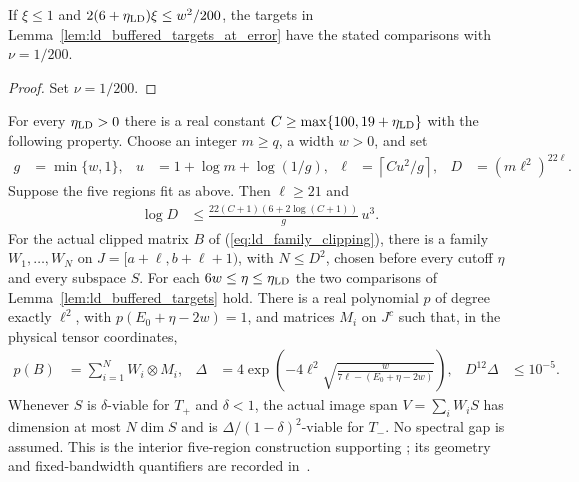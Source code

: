 \begin{lemma}
    \label{lem:ld_buffered_targets}
    \leanok
    If $\xi\le1$ and $2(6+\eta_{\rm LD})\xi\le w^2/200$, the
    targets in Lemma~\ref{lem:ld_buffered_targets_at_error} have the
    stated comparisons with $\nu=1/200$.
\end{lemma}
\begin{proof}\leanok
    Set $\nu=1/200$.
\end{proof}

\begin{theorem}
    \label{thm:fixed_bandwidth_low_energy_family}
    \leanok
    For every $\eta_{\rm LD}>0$ there is a real constant
    $C\ge\max\{100,19+\eta_{\rm LD}\}$ with the following property.
    Choose an integer $m\ge q$, a width $w>0$, and set
    \begin{align}
        g    & =\min\{w,1\},                    &
        u    & =1+\log m+\log(1/g),             &
        \ell & =\left\lceil Cu^2/g\right\rceil, &
        D    & =(m\ell^2)^{22\ell}.
        \label{eq:ld_family_parameters}
    \end{align}
    Suppose the five regions fit as above. Then $\ell\ge21$ and
    \begin{align}
        \log D
         & \le\frac{22(C+1)(6+2\log(C+1))}{g}\,u^3.
        \label{eq:ld_family_log_count}
    \end{align}
    For the actual clipped matrix $B$ of
    (\ref{eq:ld_family_clipping}), there is a family
    $W_1,\ldots,W_N$ on $J=[a+\ell,b+\ell+1)$, with $N\le D^2$,
    chosen before every cutoff $\eta$ and every subspace $S$.
    For each $6w\le\eta\le\eta_{\rm LD}$ the two comparisons of
    Lemma~\ref{lem:ld_buffered_targets} hold. There is a real polynomial
    $p$ of degree exactly $\ell^2$, with $p(E_0+\eta-2w)=1$, and matrices
    $M_i$ on $J^c$ such that, in the physical tensor coordinates,
    \begin{align}
        p(B)                                         & =\sum_{i=1}^N W_i\otimes M_i, &
        \Delta                                       & =4\exp\left(-4\ell^2
        \sqrt{\frac{w}{7\ell-(E_0+\eta-2w)}}\right), &
        D^{12}\Delta                                 & \le10^{-5}.
        \label{eq:ld_family_filter}
    \end{align}
    Whenever $S$ is $\delta$-viable for $T_+$ and $\delta<1$,
    the actual image span $V=\sum_iW_iS$ has dimension at most
    $N\dim S$ and is $\Delta/(1-\delta)^2$-viable for $T_-$.
    No spectral gap is assumed. This is the interior five-region
    construction supporting \cite[Theorem~t:aisgapless]{Arad2016RigorousRG};
    its geometry and fixed-bandwidth quantifiers are recorded
    in~\cite{gap:alvv16_low_energy_family_scope}.
\end{theorem}
